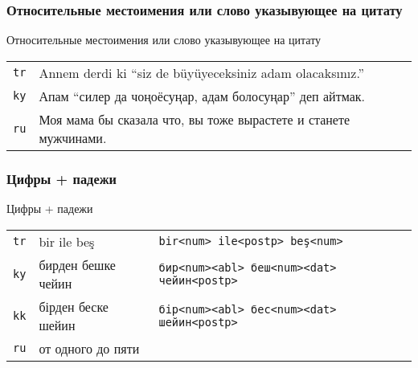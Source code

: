 \documentclass[10pt,xetex]{beamer} %
\begin{document}
\begin{frame}
	\frametitle{Относительные местоимения или слово указывующее на цитату}
	\begin{block}{Относительные местоимения или слово указывующее на цитату}
		\begin{tabular}{ll}
			\texttt{tr} & Annem {\color{green} de}rdi {\color{blue} ki} ``siz de büyüyeceksiniz adam olacaksınız.'' \\
			\texttt{ky} & Апам ``силер да чоңоёсуңар, адам болосуңар'' {\color{blue} деп} {\color{green} айт}мак. \\
			\texttt{ru} & Моя мама бы {\color{green} сказа}ла {\color{blue} что}, вы тоже вырастете и станете мужчинами. \\
		\end{tabular}
	\end{block}
\end{frame}

\begin{frame}
	\frametitle{Цифры + падежи}
	\begin{block}{Цифры + падежи}
		\begin{tabular}{lll}
			\texttt{tr} & {\color{green} bir} ile {\color{blue} beş} & \texttt{bir<num> ile<postp> beş<num>} \\
			\texttt{ky} & {\color{green} бир}ден {\color{blue} беш}ке чейин & \texttt{бир<num><abl> беш<num><dat> чейин<postp>} \\
			\texttt{kk} & {\color{green} бір}ден {\color{blue} бес}ке шейин & \texttt{бір<num><abl> бес<num><dat> шейин<postp>} \\
			\texttt{ru} & от {\color{green} одн}ого до {\color{blue} пят}и & 
		\end{tabular}
	\end{block}
\end{frame}
\end{document}
